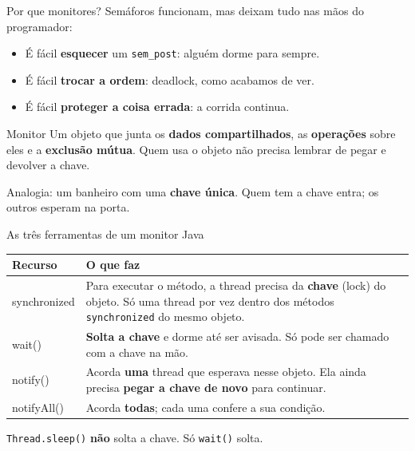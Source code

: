 \documentclass[aspectratio=169]{beamer}
\begin{document}
\begin{frame}{Por que monitores?}
Semáforos funcionam, mas deixam tudo nas mãos do programador:

\begin{itemize}
    \item É fácil \textbf{esquecer} um \texttt{sem\_post}: alguém dorme para sempre.
    \item É fácil \textbf{trocar a ordem}: deadlock, como acabamos de ver.
    \item É fácil \textbf{proteger a coisa errada}: a corrida continua.
\end{itemize}

\vspace{0.6em}
\begin{alertblock}{Monitor}
Um objeto que junta os \textbf{dados compartilhados}, as \textbf{operações} sobre eles e a \textbf{exclusão mútua}. Quem usa o objeto não precisa lembrar de pegar e devolver a chave.
\end{alertblock}

\small Analogia: um banheiro com uma \textbf{chave única}. Quem tem a chave entra; os outros esperam na porta.
\end{frame}

\begin{frame}{As três ferramentas de um monitor Java}
\begin{center}
\begin{tabular}{@{}>{\ttfamily}lR{9.6cm}@{}}
\toprule
\textrm{\textbf{Recurso}} & \textbf{O que faz} \\
\midrule
synchronized & Para executar o método, a thread precisa da \textbf{chave} (lock) do objeto. Só uma thread por vez dentro dos métodos \texttt{synchronized} do mesmo objeto. \\
wait() & \textbf{Solta a chave} e dorme até ser avisada. Só pode ser chamado com a chave na mão. \\
notify() & Acorda \textbf{uma} thread que esperava nesse objeto. Ela ainda precisa \textbf{pegar a chave de novo} para continuar. \\
notifyAll() & Acorda \textbf{todas}; cada uma confere a sua condição. \\
\bottomrule
\end{tabular}
\end{center}

\vspace{0.4em}
\small \texttt{Thread.sleep()} \textbf{não} solta a chave. Só \texttt{wait()} solta.
\end{frame}
\end{document}
